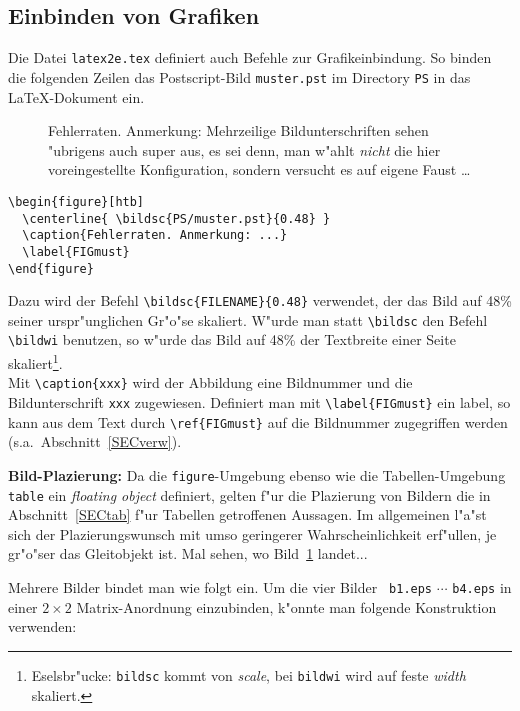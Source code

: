 \subsection{Einbinden von Grafiken} \label{SUBSECbilder}
%
Die Datei {\tt latex2e.tex} definiert auch Befehle zur Grafikeinbindung.
So binden die folgenden Zeilen das Postscript-Bild {\tt muster.pst} im 
Directory {\tt PS} in das \LaTeX-Dokument ein.
%
\begin{figure}[htb]
  \centerline{  }
  \caption{Fehlerraten. Anmerkung:
           Mehrzeilige Bildunterschriften sehen "ubrigens auch super
           aus, es sei denn, man w"ahlt \emph{nicht} die hier voreingestellte
           Konfiguration, sondern versucht es auf eigene Faust \ldots}
  \label{FIGmust}
\end{figure}
%
\begin{verbatim}
\begin{figure}[htb]
  \centerline{ \bildsc{PS/muster.pst}{0.48} }
  \caption{Fehlerraten. Anmerkung: ...}
  \label{FIGmust}
\end{figure}
\end{verbatim}
%
Dazu wird der Befehl \verb+\bildsc{FILENAME}{0.48}+ verwendet,
der das Bild auf 48\% seiner urspr"unglichen Gr"o"se skaliert.
W"urde man statt \verb+\bildsc+ den Befehl \verb+\bildwi+ benutzen,
so w"urde das Bild auf 48\% der Textbreite einer Seite 
skaliert\footnote{Eselsbr"ucke:
{\tt bildsc} kommt von {\em scale}, bei {\tt bildwi} wird auf feste {\em width} skaliert.}.\\
Mit \verb+\caption{xxx}+ wird der Abbildung eine Bildnummer und die Bildunterschrift
{\tt xxx} zugewiesen. Definiert man mit \verb+\label{FIGmust}+ ein label,
so kann aus dem Text durch \verb+\ref{FIGmust}+ auf die Bildnummer zugegriffen werden
(s.a.\ Abschnitt~\ref{SECverw}).

{\bf Bild-Plazierung:} Da die {\tt figure}-Umgebung ebenso wie die
Tabellen-Umgebung {\tt table} ein {\em floating object} definiert,
gelten f"ur die Plazierung von Bildern die in Abschnitt~\ref{SECtab}
f"ur Tabellen getroffenen Aussagen.  Im allgemeinen l"a"st sich der
Plazierungswunsch mit umso geringerer Wahrscheinlichkeit erf"ullen, je
gr"o"ser das Gleitobjekt ist. Mal sehen, wo Bild~\ref{FIGmust}
landet...

Mehrere Bilder bindet man wie folgt ein. Um die vier Bilder {\tt
b1.eps} $\cdots$ {\tt b4.eps} in einer $2 \times 2$ Matrix-Anordnung
einzubinden, k"onnte man folgende Konstruktion verwenden:

